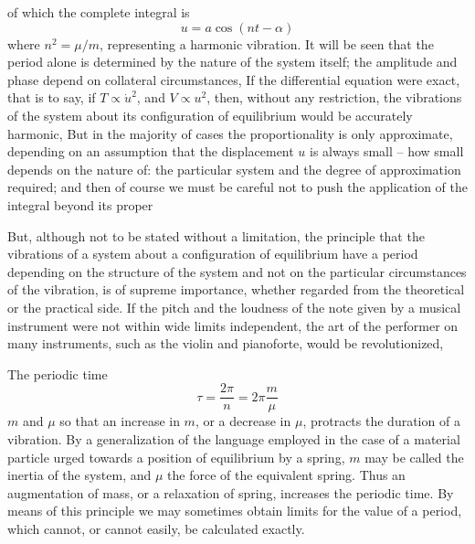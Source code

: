 of which the complete integral is
\begin{equation}
u = a \cos( nt - \alpha )
\end{equation}
where \(n^2 = \mu/m\), representing a harmonic vibration. It
will be seen that the period alone is determined by the nature of the system
itself; the amplitude and phase depend on collateral circumstances, If the
differential equation were exact, that is to say, if
\(T \propto \dot{u}^2\),
 and
\(V \propto u^2\), then, without any restriction, the
vibrations of the system about its configuration of equilibrium would be
accurately harmonic, But in the majority of cases the proportionality is only
approximate, depending on an assumption that the displacement
\(u\)
is always small
-- how small depends on the nature of: the particular system and the degree of
approximation required; and then of course we must be careful not to push the
application of the integral beyond its proper

But, although not to be stated without a limitation, the principle that the
vibrations of a system about a configuration of equilibrium have a period
depending on the structure of the system and not on the particular
circumstances of the vibration, is of supreme importance, whether regarded from
the theoretical or the practical side. If the pitch and the loudness of the
note given by a musical instrument were not within wide limits independent, the
art of the performer on many instruments, such as the violin and pianoforte,
would be revolutionized,

The periodic time
\begin{equation}
\tau = \frac{2 \pi}{n} = 2 \pi \frac{m}{\mu}
\end{equation}
\(m\) and \(\mu\)
so that an increase in
\(m\), or a decrease in
\(\mu\), protracts the duration of a
vibration. By a generalization of the language employed in the case of a
material particle urged towards a position of equilibrium by a spring,
\(m\)
may be
called the inertia of the system, and
\(\mu\) the force of the equivalent spring.
Thus an augmentation of mass, or a relaxation of spring, increases the periodic
time. By means of this principle we may sometimes obtain limits for the value
of a period, which cannot, or cannot easily, be calculated exactly.

